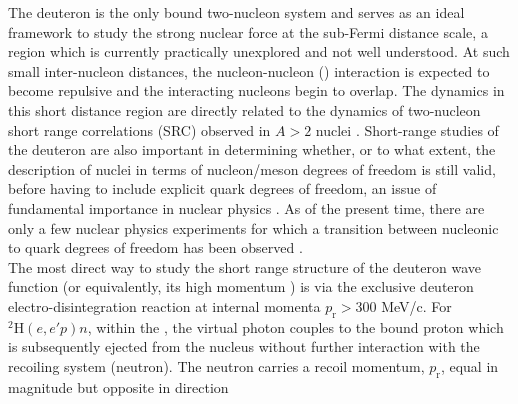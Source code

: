 The deuteron is the only bound two-nucleon system and serves as an ideal framework to study the strong nuclear force at the sub-Fermi distance scale, a region which is currently
practically unexplored and not well understood. At such small inter-nucleon distances, the nucleon-nucleon (\DIFdelbegin {}\DIFdelend \DIFaddbegin {}\DIFaddend ) interaction is expected to become repulsive and the interacting
nucleons begin to overlap. The dynamics in this short distance region are directly related to the dynamics of two-nucleon short range correlations (SRC) observed in $A>2$ nuclei \DIFdelbegin {}\DIFdelend \DIFaddbegin {}\DIFaddend .
Short-range studies of the deuteron are also important in determining whether, or to what extent, the description of nuclei in terms of nucleon/meson degrees of freedom is still valid, before
having to include explicit quark degrees of freedom, an issue of fundamental importance in nuclear physics \cite{sargsian_2015}. As of the present time, there are only a few nuclear physics experiments for
which a transition between nucleonic to quark degrees of freedom has been observed \cite{PhysRevLett.81.4576,PhysRevLett.87.102302,PhysRevC.66.042201}.
\DIFaddbegin {}\DIFaddend \\
\indent The most direct way to study the short range structure of the deuteron wave function (or equivalently, its high momentum \DIFdelbegin {}\DIFdelend \DIFaddbegin {}\DIFaddend ) is via the exclusive deuteron
electro-disintegration reaction at internal momenta $p_{\mathrm{r}}>300$ MeV/c. For $^{2}\mathrm{H}(e,e'p)n$, within the \DIFdelbegin {}\DIFdelend \DIFaddbegin {}\DIFaddend , the virtual photon couples to
the bound proton which is subsequently ejected from the nucleus without further interaction with the recoiling system (neutron). The neutron carries a recoil momentum, $p_{\mathrm{r}}$, equal in magnitude but opposite in direction
